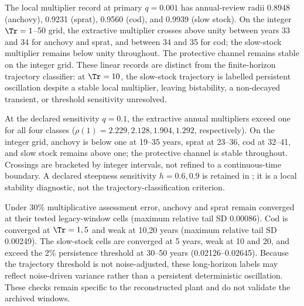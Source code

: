 The local multiplier record at primary \(q=0.001\) has annual-review radii 0.8948 (anchovy), 0.9231 (sprat), 0.9560 (cod), and 0.9939 (slow stock). On the integer \(\Tr=1\)--50 grid, the extractive multiplier crosses above unity between years 33 and 34 for anchovy and sprat, and between 34 and 35 for cod; the slow-stock multiplier remains below unity throughout. The protective channel remains stable on the integer grid. These linear records are distinct from the finite-horizon trajectory classifier: at \(\Tr=10\), the slow-stock trajectory is labelled persistent oscillation despite a stable local multiplier, leaving bistability, a non-decayed transient, or threshold sensitivity unresolved.

At the declared sensitivity \(q=0.1\), the extractive annual multipliers exceed one for all four classes (\(\rho(1)=2.229,2.128,1.904,1.292\), respectively). On the integer grid, anchovy is below one at 19--35 years, sprat at 23--36, cod at 32--41, and slow stock remains above one; the protective channel is stable throughout. Crossings are bracketed by integer intervals, not refined to a continuous-time boundary. A declared steepness sensitivity \(h=0.6,0.9\) is retained in \texttt{}; it is a local stability diagnostic, not the trajectory-classification criterion.

Under 30\% multiplicative assessment error, anchovy and sprat remain converged at their tested legacy-window cells (maximum relative tail SD 0.00086). Cod is converged at \(\Tr=1,5\) and weak at 10,20 years (maximum relative tail SD 0.00249). The slow-stock cells are converged at 5 years, weak at 10 and 20, and exceed the 2\% persistence threshold at 30--50 years (0.02126--0.02645). Because the trajectory threshold is not noise-adjusted, these long-horizon labels may reflect noise-driven variance rather than a persistent deterministic oscillation. These checks remain specific to the reconstructed plant and do not validate the archived windows.

